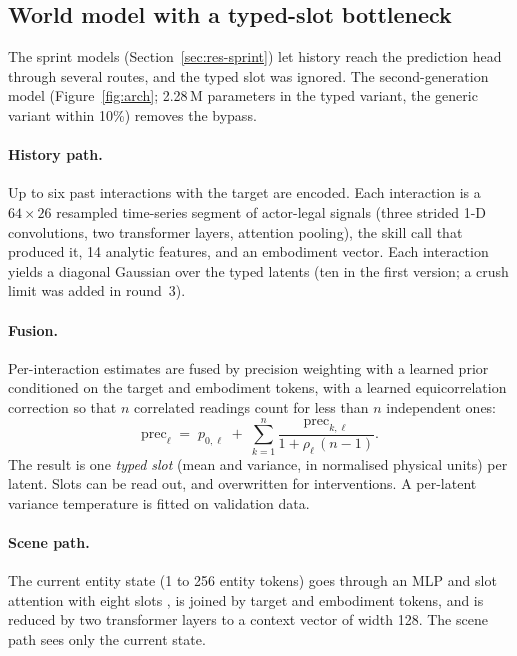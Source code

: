 \subsection{World model with a typed-slot bottleneck}
\label{sec:model}

The sprint models (Section~\ref{sec:res-sprint}) let history reach the prediction head through several routes,
and the typed slot was ignored. The second-generation model (Figure~\ref{fig:arch}; 2.28\,M parameters in the
typed variant, the generic variant within 10\%) removes the bypass.

\paragraph{History path.} Up to six past interactions with the target are encoded. Each interaction is a
$64\times26$ resampled time-series segment of actor-legal signals (three strided 1-D convolutions, two
transformer layers, attention pooling), the skill call that produced it, 14 analytic features, and an embodiment
vector. Each interaction yields a diagonal Gaussian over the typed latents (ten in the first version; a crush
limit was added in round~3).

\paragraph{Fusion.} Per-interaction estimates are fused by precision weighting with a learned prior conditioned
on the target and embodiment tokens, with a learned equicorrelation correction so that $n$ correlated readings
count for less than $n$ independent ones:
\begin{equation}
  \mathrm{prec}_\ell \;=\; p_{0,\ell} \;+\; \sum_{k=1}^{n} \frac{\mathrm{prec}_{k,\ell}}{1 + \rho_\ell\,(n-1)} .
\end{equation}
The result is one \emph{typed slot} (mean and variance, in normalised physical units) per latent. Slots can be
read out, and overwritten for interventions. A per-latent variance temperature is fitted on validation data.

\paragraph{Scene path.} The current entity state (1 to 256 entity tokens) goes through an MLP and slot attention
with eight slots \citep{locatello2020slot}, is joined by target and embodiment tokens, and is reduced by two
transformer layers to a context vector of width 128. The scene path sees only the current state.

